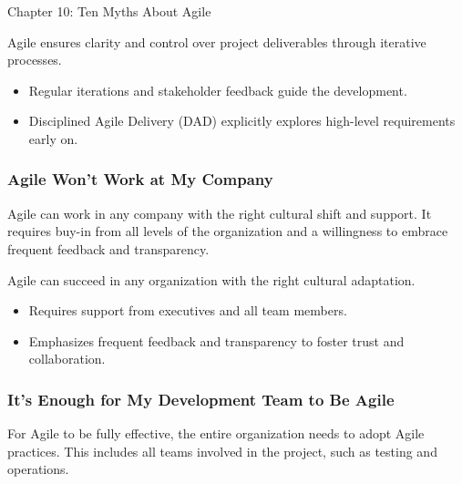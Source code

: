 \begin{notes}{Chapter 10: Ten Myths About Agile}
    \begin{highlight}
    
        Agile ensures clarity and control over project deliverables through iterative processes.
        
        \begin{itemize}
            \item Regular iterations and stakeholder feedback guide the development.
            \item Disciplined Agile Delivery (DAD) explicitly explores high-level requirements early on.
        \end{itemize}
    
    \end{highlight}
    
    \subsubsection*{Agile Won't Work at My Company}
    
    Agile can work in any company with the right cultural shift and support. It requires buy-in from all levels of the organization and a willingness to embrace frequent feedback and transparency.
    
    \begin{highlight}
    
        Agile can succeed in any organization with the right cultural adaptation.
        
        \begin{itemize}
            \item Requires support from executives and all team members.
            \item Emphasizes frequent feedback and transparency to foster trust and collaboration.
        \end{itemize}
    
    \end{highlight}
    
    \subsubsection*{It's Enough for My Development Team to Be Agile}
    
    For Agile to be fully effective, the entire organization needs to adopt Agile practices. This includes all teams involved in the project, such as testing and operations.
    

\end{notes}
